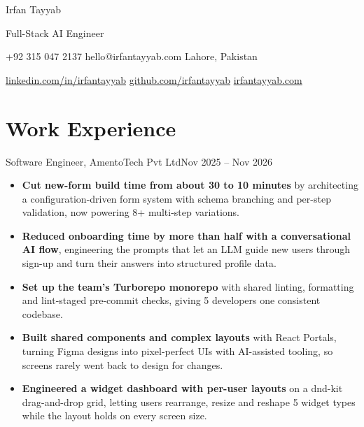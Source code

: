 \documentclass[a4paper]{article}
\newcommand{\namefont}{\fontsize{20pt}{24pt}\linespread{1}\selectfont\semiboldfont\color{headgray}}  %
\newcommand{\headlinefont}{\fontsize{13pt}{16pt}\linespread{1}\selectfont\mdseries\color{headgray}} %
\newlength{\headerlinegap}  \setlength{\headerlinegap}{2pt}  %
\newlength{\contactgap}     \setlength{\contactgap}{1pt}     %
\newlength{\headerafter}    \setlength{\headerafter}{13pt} %
\newlength{\entryindent}    \setlength{\entryindent}{10pt}   %
\newlength{\markerwidth}    \setlength{\markerwidth}{3pt}    %
\newcommand{\bluelink}[2]{\href{#1}{#2}} %
\newcommand{\jobmarker}{{\color{headgray}%
  \smash{\rule[-1pt]{\markerwidth}{\dimexpr\fontcharht\font`H+2pt\relax}}}}
\newcommand{\job}[3]{%
  \makebox[\entryindent][l]{\jobmarker}%
  {\semiboldfont\color{black}#1}, #2\hfill #3\par
}
\begin{document}

\begin{minipage}[b]{0.28\linewidth}
  \raggedright
  {\namefont Irfan Tayyab\par}
  \vspace{\headerlinegap}
  {\headlinefont Full-Stack AI Engineer\par}
\end{minipage}%
\hfill
\begin{minipage}[b]{0.72\linewidth}
  \raggedleft
  +92 315 047 2137\quad
  hello@irfantayyab.com\quad
  Lahore, Pakistan\par
  \vspace{\dimexpr\headerlinegap+\contactgap\relax}
  \bluelink{https://www.linkedin.com/in/irfantayyab/}{linkedin.com/in/irfantayyab}\quad
  \bluelink{https://github.com/irfantayyab}{github.com/irfantayyab}\quad
  \bluelink{https://irfantayyab.com}{irfantayyab.com}\par
\end{minipage}\par

\addvspace{\headerafter}



\section*{Work Experience}

\job{Software Engineer}{AmentoTech Pvt Ltd}{Nov 2025 – Nov 2026}
\begin{itemize}
  \item \textbf{Cut new-form build time from about 30 to 10 minutes} by architecting a
        configuration-driven form system with schema branching and per-step validation,
        now powering 8+ multi-step variations.
  \item \textbf{Reduced onboarding time by more than half with a conversational AI flow}, engineering
        the prompts that let an LLM guide new users through sign-up and turn their answers into
        structured profile data.
  \item \textbf{Set up the team's Turborepo monorepo} with shared linting, formatting and
        lint-staged pre-commit checks, giving 5 developers one consistent codebase.
  \item \textbf{Built shared components and complex layouts} with React Portals, turning Figma
        designs into pixel-perfect UIs with AI-assisted tooling, so screens rarely went back
        to design for changes.
  \item \textbf{Engineered a widget dashboard with per-user layouts} on a dnd-kit drag-and-drop
        grid, letting users rearrange, resize and reshape 5 widget types while the layout holds
        on every screen size.
\end{itemize}
\end{document}
